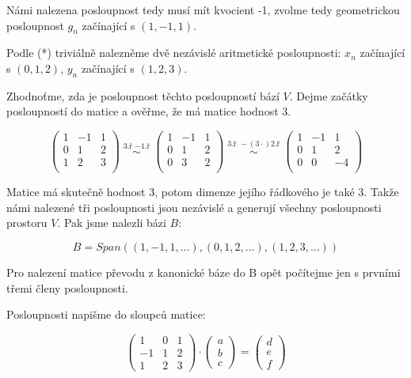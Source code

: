 \documentclass[12pt]{article}
\begin{document}
\begin{enumerate}
\begin{enumerate}
      Námi nalezena posloupnost tedy musí mít kvocient -1, zvolme tedy geometrickou posloupnost
      $g_n$ začínající s $(1,-1,1)$.

      Podle (*) triviálně nalezněme dvě nezávislé aritmetické posloupnosti: $x_n$ začínající s $(0,1,2)$,
      $y_n$ začínající s $(1,2,3)$.

      Zhodnoťme, zda je posloupnost těchto posloupností bází $V$.
      Dejme začátky posloupností do matice a ověřme, že má matice hodnost 3.

      \[
        \left(\begin{array}{ccc}
          1&-1&1 \\
          0&1&2 \\
          1&2&3 \\
        \end{array}\right)
        \overset{\text{3.ř } -\text{1.ř}}{\;\sim\;}
        \left(\begin{array}{ccc}
          1&-1&1 \\
          0&1&2 \\
          0&3&2 \\
        \end{array}\right)
        \overset{\text{3.ř } -(3\cdot)\text{2.ř}}{\;\sim\;}
        \left(\begin{array}{ccc}
          1&-1&1 \\
          0&1&2 \\
          0&0&-4 \\
        \end{array}\right)
      \]

      Matice má skutečně hodnost 3, potom dimenze jejího řádkového je také 3.
      Takže námi nalezené tři posloupnosti jsou nezávislé a generují všechny posloupnosti prostoru $V$.
      Pak jsme nalezli bázi $B$:

      \[
        B = Span\left(
          (1,-1,1,...),
          (0,1,2,...),
          (1,2,3,...)
        \right)
      \]

      Pro nalezení matice převodu z kanonické báze do B opět počítejme jen
      s prvními třemi členy posloupnosti.

      Posloupnosti napišme do sloupců matice:

      \[
        \left(\begin{array}{ccc}
          1 & 0 & 1 \\
          -1 & 1 & 2 \\
          1 & 2 & 3
        \end{array}\right) \cdot \left(\begin{array}{c}
          a \\ b \\ c
        \end{array}\right) = \left(\begin{array}{c}
          d \\ e \\ f
        \end{array}\right)
      \]


\end{enumerate}
\end{enumerate}
\end{document}
